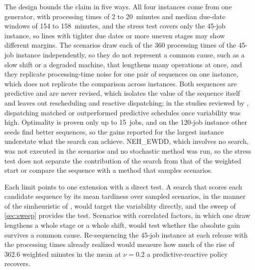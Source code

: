 \sumpara The design bounds the claim in five ways. \sumparaend
\fin All four instances come from one generator, with processing times of 2 to 20~minutes and median due-date windows of 154 to 158~minutes, and the stress test covers only the 45-job instance, so lines with tighter due dates or more uneven stages may show different margins. \fine
\fin The scenarios draw each of the 360 processing times of the 45-job instance independently, so they do not represent a common cause, such as a slow shift or a degraded machine, that lengthens many operations at once, and they replicate processing-time noise for one pair of sequences on one instance, which does not replicate the comparison across instances. \fine
\fin Both sequences are predictive and are never revised, which isolates the value of the sequence itself and leaves out rescheduling and reactive dispatching; in the studies reviewed by \citet{aytug2005executing}, dispatching matched or outperformed predictive schedules once variability was high. \fine
\fin Optimality is proven only up to 15~jobs, and on the 120-job instance other seeds find better sequences, so the gains reported for the largest instance understate what the search can achieve. \fine
\fin NEH\_EWDD, which involves no search, was not executed in the scenarios and no stochastic method was run, so the stress test does not separate the contribution of the search from that of the weighted start or compare the sequence with a method that samples scenarios. \fine

\sumpara Each limit points to one extension with a direct test. \sumparaend
\fin A search that scores each candidate sequence by its mean tardiness over sampled scenarios, in the manner of the simheuristic of \citet{juan2014simheuristic}, would target the variability directly, and the sweep of \cref{sec:sweep} provides the test. \fine
\fin Scenarios with correlated factors, in which one draw lengthens a whole stage or a whole shift, would test whether the absolute gain survives a common cause. \fine
\fin Re-sequencing the 45-job instance at each release with the processing times already realized would measure how much of the rise of 362.6 weighted minutes in the mean at $\nu = 0.2$ a predictive-reactive policy recovers. \fine
